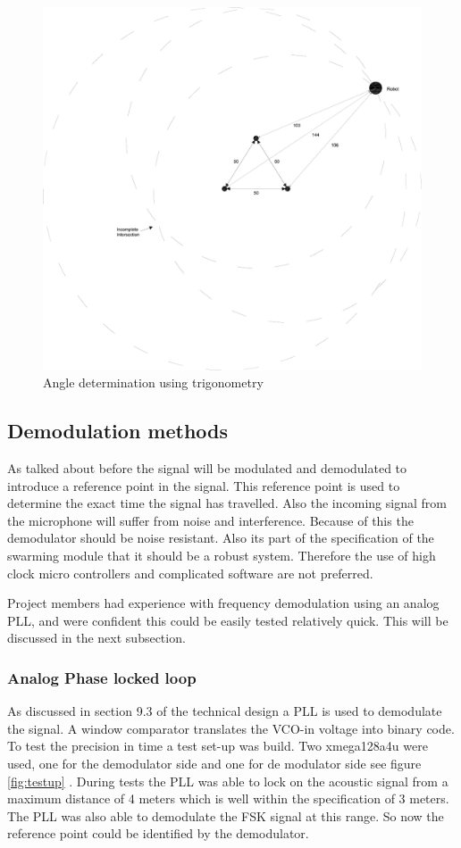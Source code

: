 \documentclass[10pt,a4paper]{article}
\begin{document}
\begin{figure}[H]
\centering
\includegraphics[width=1\textwidth]{trigonometry.pdf}
\caption{Angle determination using trigonometry}
\label{trigonometry}
\end{figure}

\subsection{Demodulation methods}
As talked about before the signal will be modulated and demodulated to introduce a reference point in the signal. This reference point is used to  determine the exact time the signal has travelled. Also the incoming signal from the microphone will suffer from noise and interference. Because of this the demodulator should be noise resistant. Also its part of the specification of the swarming module that it should be a robust system. Therefore the use of high clock micro controllers and complicated software are not preferred.

Project members had experience with frequency demodulation using an analog PLL, and were confident this could be easily tested relatively quick. This will be discussed in the next subsection.

\subsubsection{Analog Phase locked loop}
As discussed in section 9.3 of the technical design a PLL is used to demodulate the signal. A window comparator translates the VCO-in voltage into binary code. To test the precision in time a test set-up was build. Two xmega128a4u were used, one for the demodulator side and one for de modulator side see figure \ref{fig:testup} . During tests the PLL was able to lock on the acoustic signal from a maximum distance of 4 meters which is well within the specification of 3 meters.  The PLL was also able to demodulate the FSK signal at this range. So now the reference point could be identified by the demodulator.
\end{document}
